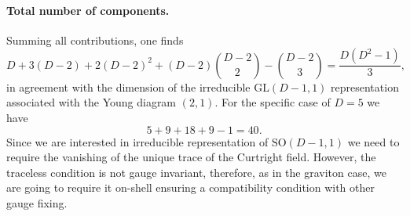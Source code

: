 \documentclass[a4paper,12pt]{article}
\begin{document}
\paragraph{Total number of components.}

Summing all contributions, one finds
\begin{equation}
D + 3(D-2)+2(D-2)^2
+ (D-2)\binom{D-2}{2}-\binom{D-2}{3}
= \frac{D(D^2-1)}{3},
\end{equation}
in agreement with the dimension of the irreducible $\mathrm{GL}(D-1,1)$ representation associated with the Young diagram $(2,1)$. For the specific case of $D=5$ we have
\begin{equation}
    5+9+18+9-1=40.
\end{equation}
Since we are interested in irreducible representation of  $\mathrm{SO}(D-1,1)$ we need to require the vanishing of the unique trace of the Curtright field. However, the traceless condition is not gauge invariant, therefore, as in the graviton case, we are going to require it on-shell ensuring a compatibility condition with other gauge fixing.\\
\end{document}
